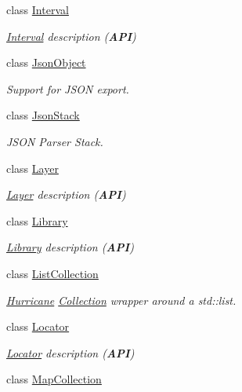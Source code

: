 \begin{DoxyCompactItemize}
class \mbox{\hyperlink{classHurricane_1_1Interval}{Interval}}
\begin{DoxyCompactList}\small\item\em \mbox{\hyperlink{classHurricane_1_1Interval}{Interval}} description ({\bfseries A\+PI}) \end{DoxyCompactList}\item 
class \mbox{\hyperlink{classHurricane_1_1JsonObject}{Json\+Object}}
\begin{DoxyCompactList}\small\item\em Support for J\+S\+ON export. \end{DoxyCompactList}\item 
class \mbox{\hyperlink{classHurricane_1_1JsonStack}{Json\+Stack}}
\begin{DoxyCompactList}\small\item\em J\+S\+ON Parser Stack. \end{DoxyCompactList}\item 
class \mbox{\hyperlink{classHurricane_1_1Layer}{Layer}}
\begin{DoxyCompactList}\small\item\em \mbox{\hyperlink{classHurricane_1_1Layer}{Layer}} description ({\bfseries A\+PI}) \end{DoxyCompactList}\item 
class \mbox{\hyperlink{classHurricane_1_1Library}{Library}}
\begin{DoxyCompactList}\small\item\em \mbox{\hyperlink{classHurricane_1_1Library}{Library}} description ({\bfseries A\+PI}) \end{DoxyCompactList}\item 
class \mbox{\hyperlink{classHurricane_1_1ListCollection}{List\+Collection}}
\begin{DoxyCompactList}\small\item\em \mbox{\hyperlink{namespaceHurricane}{Hurricane}} \mbox{\hyperlink{classHurricane_1_1Collection}{Collection}} wrapper around a std\+::list. \end{DoxyCompactList}\item 
class \mbox{\hyperlink{classHurricane_1_1Locator}{Locator}}
\begin{DoxyCompactList}\small\item\em \mbox{\hyperlink{classHurricane_1_1Locator}{Locator}} description ({\bfseries A\+PI}) \end{DoxyCompactList}\item 
class \mbox{\hyperlink{classHurricane_1_1MapCollection}{Map\+Collection}}

\end{DoxyCompactItemize}
